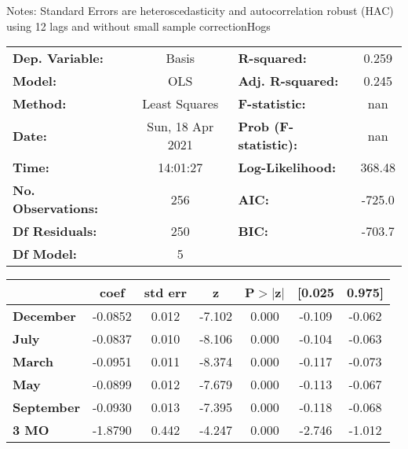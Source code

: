 Notes: \newline
 [1] Standard Errors are heteroscedasticity and autocorrelation robust (HAC) using 12 lags and without small sample correctionHogs\begin{center}
\begin{tabular}{lclc}
\toprule
\textbf{Dep. Variable:}    &      Basis       & \textbf{  R-squared:         } &     0.259   \\
\textbf{Model:}            &       OLS        & \textbf{  Adj. R-squared:    } &     0.245   \\
\textbf{Method:}           &  Least Squares   & \textbf{  F-statistic:       } &       nan   \\
\textbf{Date:}             & Sun, 18 Apr 2021 & \textbf{  Prob (F-statistic):} &      nan    \\
\textbf{Time:}             &     14:01:27     & \textbf{  Log-Likelihood:    } &    368.48   \\
\textbf{No. Observations:} &         256      & \textbf{  AIC:               } &    -725.0   \\
\textbf{Df Residuals:}     &         250      & \textbf{  BIC:               } &    -703.7   \\
\textbf{Df Model:}         &           5      & \textbf{                     } &             \\
\bottomrule
\end{tabular}
\begin{tabular}{lcccccc}
                   & \textbf{coef} & \textbf{std err} & \textbf{z} & \textbf{P$> |$z$|$} & \textbf{[0.025} & \textbf{0.975]}  \\
\midrule
\textbf{December}  &      -0.0852  &        0.012     &    -7.102  &         0.000        &       -0.109    &       -0.062     \\
\textbf{July}      &      -0.0837  &        0.010     &    -8.106  &         0.000        &       -0.104    &       -0.063     \\
\textbf{March}     &      -0.0951  &        0.011     &    -8.374  &         0.000        &       -0.117    &       -0.073     \\
\textbf{May}       &      -0.0899  &        0.012     &    -7.679  &         0.000        &       -0.113    &       -0.067     \\
\textbf{September} &      -0.0930  &        0.013     &    -7.395  &         0.000        &       -0.118    &       -0.068     \\
\textbf{3 MO}      &      -1.8790  &        0.442     &    -4.247  &         0.000        &       -2.746    &       -1.012     \\

\end{tabular}
\end{center}
